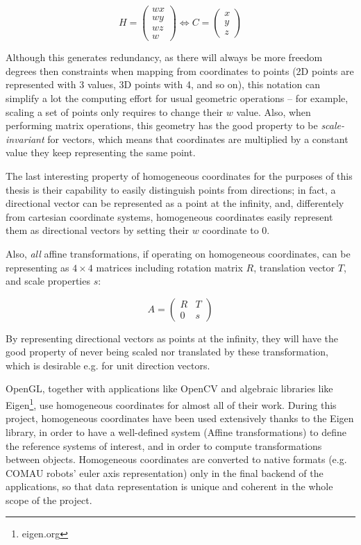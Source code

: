 \begin{equation}
H=\left(\begin{array}{c}wx\\wy\\wz\\w\end{array}\right) \Leftrightarrow
C=\left(\begin{array}{c}x\\y\\z\end{array}\right)
\end{equation}

Although this generates redundancy, as there will always be more freedom degrees
then constraints when mapping from coordinates to points (2D points are
represented with 3 values, 3D points with 4, and so on), this notation can
simplify a lot the computing effort for usual geometric operations -- for
example, scaling a set of points only requires to change their $w$ value.
Also, when performing matrix operations, this geometry has the good property to
be \emph{scale-invariant} for vectors, which means that coordinates are
multiplied by a constant value they keep representing the same point.

The last interesting property of homogeneous coordinates for the purposes of
this thesis is their capability to easily distinguish points from directions;
in fact, a directional vector can be represented as a point at the infinity,
and, differentely from cartesian coordinate systems, homogeneous coordinates
easily represent them as directional vectors by setting their $w$ coordinate to
$0$.

Also, \emph{all} affine transformations, if operating on homogeneous
coordinates, can be representing as $4\times 4$ matrices including rotation
matrix $R$, translation vector $T$, and scale properties $s$:

\begin{equation}
  A=\begin{pmatrix}
    R & T \\
    0 & s
  \end{pmatrix}
\end{equation}

By representing directional vectors as points at the infinity, they will have
the good property of never being scaled nor translated by these transformation,
which is desirable e.g. for unit direction vectors.

OpenGL, together with applications like OpenCV and algebraic libraries like
Eigen\footnote{eigen.org}, use homogeneous coordinates for almost all of their
work. During this project, homogeneous coordinates have been used extensively
thanks to the Eigen library, in order to have a well-defined system (Affine
transformations) to define the reference systems of interest, and in order to
compute transformations between objects. Homogeneous coordinates are converted
to native formats (e.g. COMAU robots' euler axis representation) only in the
final backend of the applications, so that data representation is unique and
coherent in the whole scope of the project.

